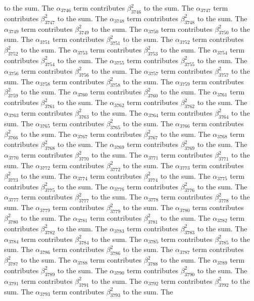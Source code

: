 \begin{lemma}
to the sum. The $\alpha_{3746}$ term contributes $\beta_{3746}^{2}$ to the sum. The $\alpha_{3747}$ term contributes $\beta_{3747}^{2}$ to the sum. The $\alpha_{3748}$ term contributes $\beta_{3748}^{2}$ to the sum. The $\alpha_{3749}$ term contributes $\beta_{3749}^{2}$ to the sum. The $\alpha_{3750}$ term contributes $\beta_{3750}^{2}$ to the sum. The $\alpha_{3751}$ term contributes $\beta_{3751}^{2}$ to the sum. The $\alpha_{3752}$ term contributes $\beta_{3752}^{2}$ to the sum. The $\alpha_{3753}$ term contributes $\beta_{3753}^{2}$ to the sum. The $\alpha_{3754}$ term contributes $\beta_{3754}^{2}$ to the sum. The $\alpha_{3755}$ term contributes $\beta_{3755}^{2}$ to the sum. The $\alpha_{3756}$ term contributes $\beta_{3756}^{2}$ to the sum. The $\alpha_{3757}$ term contributes $\beta_{3757}^{2}$ to the sum. The $\alpha_{3758}$ term contributes $\beta_{3758}^{2}$ to the sum. The $\alpha_{3759}$ term contributes $\beta_{3759}^{2}$ to the sum. The $\alpha_{3760}$ term contributes $\beta_{3760}^{2}$ to the sum. The $\alpha_{3761}$ term contributes $\beta_{3761}^{2}$ to the sum. The $\alpha_{3762}$ term contributes $\beta_{3762}^{2}$ to the sum. The $\alpha_{3763}$ term contributes $\beta_{3763}^{2}$ to the sum. The $\alpha_{3764}$ term contributes $\beta_{3764}^{2}$ to the sum. The $\alpha_{3765}$ term contributes $\beta_{3765}^{2}$ to the sum. The $\alpha_{3766}$ term contributes $\beta_{3766}^{2}$ to the sum. The $\alpha_{3767}$ term contributes $\beta_{3767}^{2}$ to the sum. The $\alpha_{3768}$ term contributes $\beta_{3768}^{2}$ to the sum. The $\alpha_{3769}$ term contributes $\beta_{3769}^{2}$ to the sum. The $\alpha_{3770}$ term contributes $\beta_{3770}^{2}$ to the sum. The $\alpha_{3771}$ term contributes $\beta_{3771}^{2}$ to the sum. The $\alpha_{3772}$ term contributes $\beta_{3772}^{2}$ to the sum. The $\alpha_{3773}$ term contributes $\beta_{3773}^{2}$ to the sum. The $\alpha_{3774}$ term contributes $\beta_{3774}^{2}$ to the sum. The $\alpha_{3775}$ term contributes $\beta_{3775}^{2}$ to the sum. The $\alpha_{3776}$ term contributes $\beta_{3776}^{2}$ to the sum. The $\alpha_{3777}$ term contributes $\beta_{3777}^{2}$ to the sum. The $\alpha_{3778}$ term contributes $\beta_{3778}^{2}$ to the sum. The $\alpha_{3779}$ term contributes $\beta_{3779}^{2}$ to the sum. The $\alpha_{3780}$ term contributes $\beta_{3780}^{2}$ to the sum. The $\alpha_{3781}$ term contributes $\beta_{3781}^{2}$ to the sum. The $\alpha_{3782}$ term contributes $\beta_{3782}^{2}$ to the sum. The $\alpha_{3783}$ term contributes $\beta_{3783}^{2}$ to the sum. The $\alpha_{3784}$ term contributes $\beta_{3784}^{2}$ to the sum. The $\alpha_{3785}$ term contributes $\beta_{3785}^{2}$ to the sum. The $\alpha_{3786}$ term contributes $\beta_{3786}^{2}$ to the sum. The $\alpha_{3787}$ term contributes $\beta_{3787}^{2}$ to the sum. The $\alpha_{3788}$ term contributes $\beta_{3788}^{2}$ to the sum. The $\alpha_{3789}$ term contributes $\beta_{3789}^{2}$ to the sum. The $\alpha_{3790}$ term contributes $\beta_{3790}^{2}$ to the sum. The $\alpha_{3791}$ term contributes $\beta_{3791}^{2}$ to the sum. The $\alpha_{3792}$ term contributes $\beta_{3792}^{2}$ to the sum. The $\alpha_{3793}$ term contributes $\beta_{3793}^{2}$ to the sum. The 
\end{lemma}
